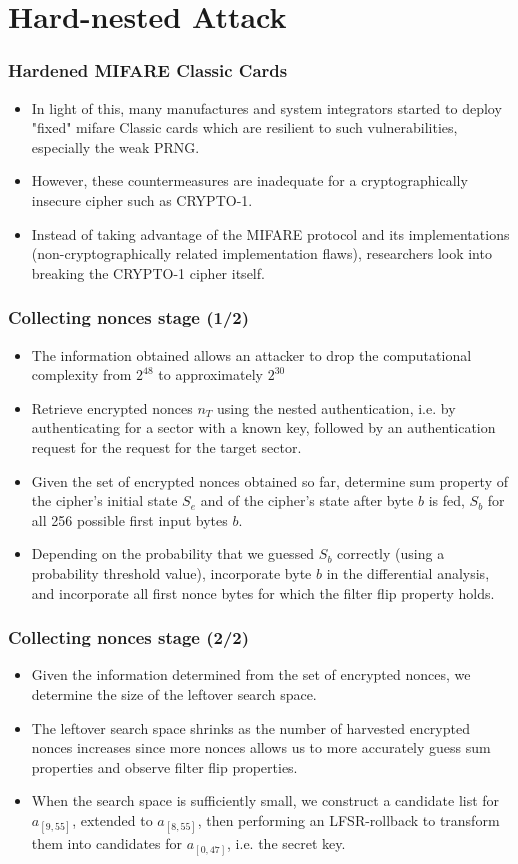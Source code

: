 \documentclass[12pt]{beamer}
\begin{document}
\section{Hard-nested Attack}
\begin{frame}
\frametitle{Hardened MIFARE Classic Cards}
\begin{itemize}
	\item In light of this, many manufactures and system integrators started to deploy "fixed" mifare Classic cards which are resilient
	to such vulnerabilities, especially the weak PRNG.
	\item However, these countermeasures
	are inadequate for a cryptographically insecure cipher such as CRYPTO-1.
	\item Instead of taking advantage of the MIFARE protocol and its implementations (non-cryptographically related implementation
	flaws), researchers look into breaking the CRYPTO-1 cipher itself.
\end{itemize}
\end{frame}

\begin{frame}
\frametitle{Collecting nonces stage (1/2)}
\begin{itemize}
	\item The information obtained allows an attacker to drop the computational complexity from $2^{48}$ to approximately $2^{30}$
	\item Retrieve encrypted nonces $n_T$ using the nested authentication, i.e. by authenticating for a sector with a known key, followed by an authentication request for the request for the target sector.
	\item Given the set of encrypted nonces obtained so far, determine sum property of the cipher's initial state $S_e$ and of the cipher's state after byte $b$ is fed, $S_b$ for all 256 possible first input bytes $b$.
	\item Depending on the probability that we guessed $S_b$ correctly (using a probability threshold value), incorporate byte $b$ in the differential analysis, and incorporate all first nonce bytes for which the filter flip property holds.
\end{itemize}
\end{frame}

\begin{frame}
\frametitle{Collecting nonces stage (2/2)}
\begin{itemize}
	\item Given the information determined from the set of encrypted nonces, we determine the size of the leftover search space.
	\item The leftover search space shrinks as the number of harvested encrypted nonces increases since more nonces allows us to more accurately guess sum properties and observe filter flip properties.
	\item When the search space is sufficiently small, we construct a candidate list for $a_{[9,55]}$, extended to $a_{[8,55]}$, then performing an LFSR-rollback to transform them into candidates for $a_{[0,47]}$, i.e. the secret key.
\end{itemize}
\end{frame}
\end{document}
